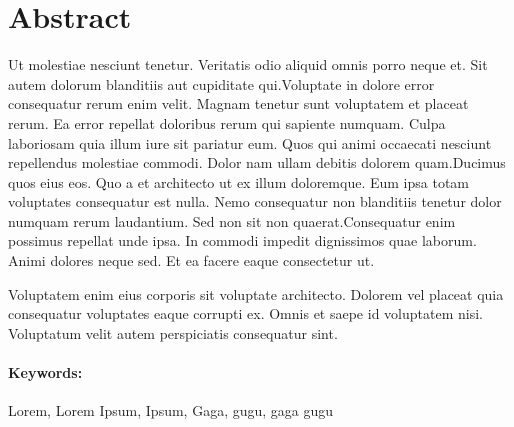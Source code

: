 
\newpage
\section*{Abstract}

Ut molestiae nesciunt tenetur. Veritatis odio aliquid omnis porro neque et. Sit autem dolorum blanditiis aut cupiditate qui.Voluptate in dolore error consequatur rerum enim velit. Magnam tenetur sunt voluptatem et placeat rerum. Ea error repellat doloribus rerum qui sapiente numquam. Culpa laboriosam quia illum iure sit pariatur eum. Quos qui animi occaecati nesciunt repellendus molestiae commodi. Dolor nam ullam debitis dolorem quam.Ducimus quos eius eos. Quo a et architecto ut ex illum doloremque. Eum ipsa totam voluptates consequatur est nulla. Nemo consequatur non blanditiis tenetur dolor numquam rerum laudantium. Sed non sit non quaerat.Consequatur enim possimus repellat unde ipsa. In commodi impedit dignissimos quae laborum. Animi dolores neque sed. Et ea facere eaque consectetur ut.

Voluptatem enim eius corporis sit voluptate architecto. Dolorem vel placeat quia consequatur voluptates eaque corrupti ex. Omnis et saepe id voluptatem nisi. Voluptatum velit autem perspiciatis consequatur sint.

\paragraph{Keywords:}
Lorem, Lorem Ipsum, Ipsum, Gaga, gugu, gaga gugu

\clearpage